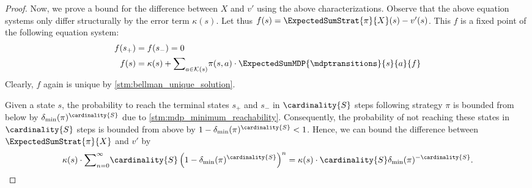 \documentclass{article}
\newcommand{\States}{S}
\newcommand{\strategy}{\pi}
\newcommand{\targetstate}{s_+}
\newcommand{\sinkstate}{s_-}
\begin{document}
\begin{proof}
	Now, we prove a bound for the difference between $X$ and $v'$ using the above characterizations.
	Observe that the above equation systems only differ structurally by the error term $\kappa(s)$.
	Let thus $f(s) = \ExpectedSumStrat{\strategy}{X}(s) - v'(s)$.
	This $f$ is a fixed point of the following equation system:
	\begin{align*}
		f(\targetstate) & = f(\sinkstate) = 0 \\
		f(s) & = \kappa(s) + {\sum}_{a \in \mathcal{K}(s)} \strategy(s, a) \cdot \ExpectedSumMDP{\mdptransitions}{s}{a}{f}
	\end{align*}
	Clearly, $f$ again is unique by \cref{stm:bellman_unique_solution}.

	Given a state $s$, the probability to reach the terminal states $\targetstate$ and $\sinkstate$ in $\cardinality{S}$ steps following strategy $\strategy$ is bounded from below by $\delta_{\min}(\strategy)^{\cardinality{\States}}$ due to \cref{stm:mdp_minimum_reachability}.
	Consequently, the probability of not reaching these states in $\cardinality{\States}$ steps is bounded from above by $1 - \delta_{\min}(\strategy)^{\cardinality{S}} < 1$.
	Hence, we can bound the difference between $\ExpectedSumStrat{\strategy}{X}$ and $v'$ by
	\begin{equation*}
		\kappa(s) \cdot {\sum}_{n=0}^\infty \cardinality{S} \left( 1 - \delta_{\min}(\strategy)^{\cardinality{S}} \right)^n = \kappa(s) \cdot \cardinality{S} \delta_{\min}(\strategy)^{-\cardinality{S}}. \qedhere 
	\end{equation*}
\end{proof}
\end{document}
